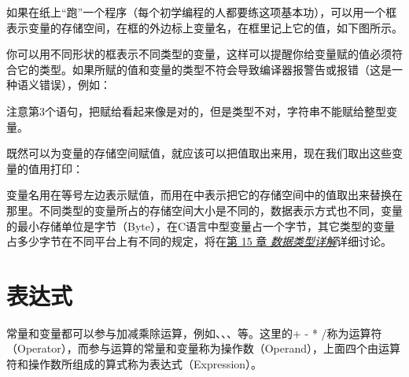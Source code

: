 如果在纸上“跑”一个程序（每个初学编程的人都要练这项基本功），可以用一个框表示变量的存储空间，在框的外边标上变量名，在框里记上它的值，如下图所示。




你可以用不同形状的框表示不同类型的变量，这样可以提醒你给变量赋的值必须符合它的类型。如果所赋的值和变量的类型不符会导致编译器报警告或报错（这是一种语义错误），例如：




注意第3个语句，把\BookCode{\BookQuoteChar{}59\BookQuoteChar{}}赋给看起来像是对的，但是类型不对，字符串不能赋给整型变量。



既然可以为变量的存储空间赋值，就应该可以把值取出来用，现在我们取出这些变量的值用打印：




变量名用在等号左边表示赋值，而用在中表示把它的存储空间中的值取出来替换在那里。不同类型的变量所占的存储空间大小是不同的，数据表示方式也不同，变量的最小存储单位是字节（Byte），在C语言中型变量占一个字节，其它类型的变量占多少字节在不同平台上有不同的规定，将在\hyperlink{db.ch15.id2756555}{第 15 章 \emph{数据类型详解}}详细讨论。




\section{表达式}
%
常量和变量都可以参与加减乘除运算，例如、、、等。这里的+ - * /称为运算符（Operator），而参与运算的常量和变量称为操作数（Operand），上面四个由运算符和操作数所组成的算式称为表达式（Expression）。



